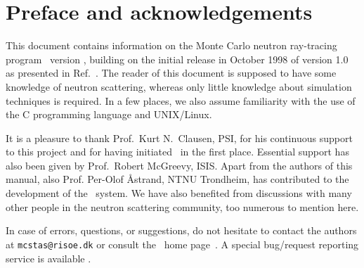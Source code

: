 
\chapter*{Preface and acknowledgements}
This document contains information on the Monte Carlo neutron
ray-tracing program \MCS\ version \version, building on the initial
release in October 1998 of version 1.0 as presented in Ref.~\cite{nn_10_20}. The reader of this
document is supposed to have some knowledge of neutron scattering,
whereas only little knowledge about simulation techniques is
required. In a few places, we also assume familiarity with the
use of the C programming language and UNIX/Linux.

It is a pleasure to thank Prof.~Kurt N.~Clausen, PSI, for his continuous
support to this project and for having initiated \MCS\ in the first
place. Essential support has also been given by Prof.~Robert McGreevy, ISIS.
Apart from the authors of this manual, also Prof. Per-Olof \AA strand, NTNU Trondheim,
has contributed to the development of the \MCS\ system.
We have also benefited
from discussions with many other people in the neutron scattering
community, too numerous to mention here.


In case of errors, questions, or suggestions,
do not hesitate to
contact the authors at \verb+mcstas@risoe.dk+
or consult the \MCS\ home page~\cite{mcstas_webpage}.
A special bug/request reporting service is available \cite{mczilla_webpage}.

